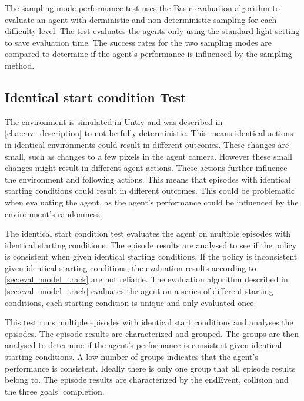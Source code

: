 The sampling mode performance test uses the Basic evaluation algorithm to evaluate an agent with derministic and non-deterministic sampling for each difficulty level. The test evaluates the agents only using the standard light setting to save evaluation time. The success rates for the two sampling modes are compared to determine if the agent's performance is influenced by the sampling method.






\subsection{Identical start condition Test}

The environment is simulated in Untiy and was described in \ref{cha:env_description} to not be fully deterministic. This means identical actions in identical environments could result in different outcomes. These changes are small, such as changes to a few pixels in the agent camera. However these small changes might result in different agent actions. These actions further influence the environment and following actions. This means that episodes with identical starting conditions could result in different outcomes. This could be problematic when evaluating the agent, as the agent's performance could be influenced by the environment's randomness.

The identical start condition test evaluates the agent on multiple episodes with identical starting conditions. The episode results are analysed to see if the policy is consistent when given identical starting conditions. If the policy is inconsistent given identical starting conditions, the evaluation results according to \ref{sec:eval_model_track} are not reliable. The evaluation algorithm described in \ref{sec:eval_model_track} evaluates the agent on a series of different starting conditions, each starting condition is unique and only evaluated once.

This test runs multiple episodes with identical start conditions and analyses the episodes. The episode results are characterized and grouped. The groups are then analysed to determine if the agent's performance is consistent given identical starting conditions. A low number of groups indicates that the agent's performance is consistent. Ideally there is only one group that all episode results belong to.
The episode results are characterized by the endEvent, collision and the three goals' completion.


